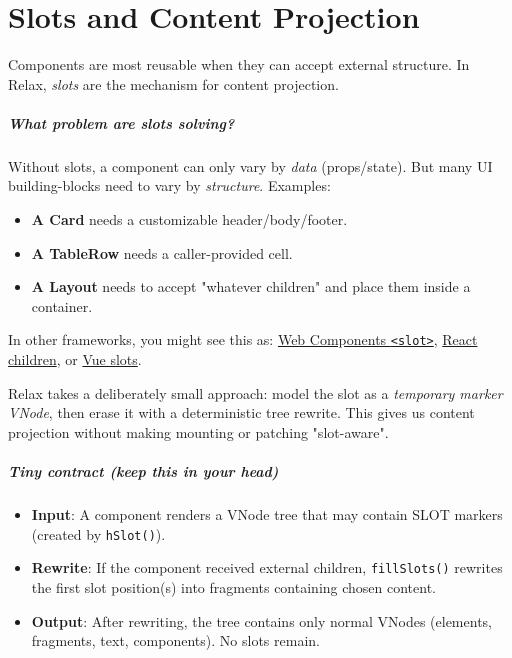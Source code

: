\chapter{Slots and Content Projection}

Components are most reusable when they can accept external structure. In Relax, \emph{slots} are the mechanism for content projection.

\paragraph{What problem are slots solving?}

Without slots, a component can only vary by \emph{data} (props/state). But many UI building-blocks need to vary by \emph{structure}.
Examples:

\begin{itemize}
  \item \textbf{A Card} needs a customizable header/body/footer.
  \item \textbf{A TableRow} needs a caller-provided cell.
  \item \textbf{A Layout} needs to accept "whatever children" and place them inside a container.
\end{itemize}

In other frameworks, you might see this as:
\href{https://developer.mozilla.org/en-US/docs/Web/API/Web_components/Using_templates_and_slots}{Web Components \texttt{<slot>}},
\href{https://react.dev/learn/passing-props-to-a-component#passing-jsx-as-children}{React children},
or \href{https://vuejs.org/guide/components/slots.html}{Vue slots}.

Relax takes a deliberately small approach: model the slot as a \emph{temporary marker VNode}, then erase it with a deterministic tree rewrite.
This gives us content projection without making mounting or patching "slot-aware".

\paragraph{Tiny contract (keep this in your head)}

\begin{itemize}
  \item \textbf{Input}: A component renders a VNode tree that may contain SLOT markers (created by \texttt{hSlot()}).
  \item \textbf{Rewrite}: If the component received external children, \texttt{fillSlots()} rewrites the first slot position(s) into fragments containing chosen content.
  \item \textbf{Output}: After rewriting, the tree contains only normal VNodes (elements, fragments, text, components). No slots remain.
\end{itemize}

